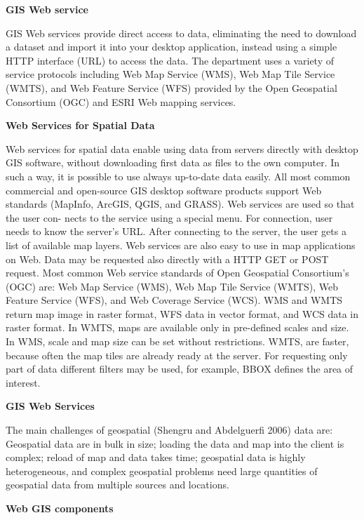 \documentclass[]{book}
\begin{document}
\textbf{GIS Web service}

GIS Web services provide direct access to data, eliminating
the need to download a dataset and import it into your
desktop application, instead using a simple HTTP interface
(URL) to access the data. The department uses a variety of
service protocols including Web Map Service (WMS), Web
Map Tile Service (WMTS), and Web Feature Service (WFS) provided by the Open Geospatial Consortium
(OGC) and ESRI Web mapping services.

\textbf{Web Services for Spatial Data}

Web services for spatial data enable using data from servers
directly with desktop GIS software, without downloading
first data as files to the own computer. In such a way, it is
possible to use always up-to-date data easily. All most
common commercial and open-source GIS desktop software
products support Web standards (MapInfo, ArcGIS, QGIS,
and GRASS). Web services are used so that the user con-
nects to the service using a special menu. For connection,
user needs to know the server's URL. After connecting to
the server, the user gets a list of available map layers. Web
services are also easy to use in map applications on Web.
Data may be requested also directly with a HTTP GET or
POST request.
Most common Web service standards of Open Geospatial
Consortium's (OGC) are: Web Map Service (WMS), Web
Map Tile Service (WMTS), Web Feature Service (WFS),
and Web Coverage Service (WCS).
WMS and WMTS return map image in raster format,
WFS data in vector format, and WCS data in raster format.
In WMTS, maps are available only in pre-defined scales and
size. In WMS, scale and map size can be set without
restrictions. WMTS, are faster, because often the map tiles
are already ready at the server. For requesting only part of
data different filters may be used, for example, BBOX
defines the area of interest.

\textbf{GIS Web Services}

The main challenges of geospatial (Shengru and Abdelguerfi
2006) data are:
Geospatial data are in bulk in size; loading the data and map
into the client is complex; reload of map and data takes time;
geospatial data is highly heterogeneous, and complex
geospatial problems need large quantities of geospatial data
from multiple sources and locations.

\textbf{Web GIS components}
\end{document}
